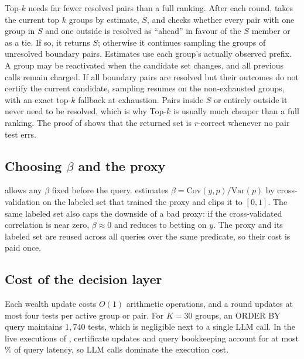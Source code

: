 Top-$k$ needs far fewer resolved pairs than a full ranking.
After each round, \sys{} takes the current top $k$ groups by estimate, $S$, and checks whether every pair with one group in $S$ and one outside is resolved as ``ahead'' in favour of the $S$ member or as a tie.
If so, it returns $S$; otherwise it continues sampling the groups of unresolved boundary pairs.
Estimates use each group's actually observed prefix. A group may be reactivated when the candidate set changes, and all previous calls remain charged. If all boundary pairs are resolved but their outcomes do not certify the current candidate, sampling resumes on the non-exhausted groups, with an exact top-$k$ fallback at exhaustion.
Pairs inside $S$ or entirely outside it never need to be resolved, which is why Top-$k$ is usually much cheaper than a full ranking.
The proof of  shows that the returned set is $r$-correct whenever no pair test errs.

\subsection{\texorpdfstring{Choosing $\beta$ and the proxy}{Choosing beta and the proxy}}

 allows any $\beta$ fixed before the query.
\sys{} estimates $\beta=\mathrm{Cov}(y,p)/\mathrm{Var}(p)$ by cross-validation on the labeled set that trained the proxy and clips it to $[0,1]$.
The same labeled set also caps the downside of a bad proxy: if the cross-validated correlation is near zero, $\beta\approx0$ and \sys{} reduces to betting on $y$.
The proxy and its labeled set are reused across all queries over the same predicate, so their cost is paid once.

\subsection{Cost of the decision layer}

Each wealth update costs $O(1)$ arithmetic operations, and a round updates at most four tests per active group or pair.
For $K=30$ groups, an ORDER BY query maintains $1{,}740$ tests, which is negligible next to a single LLM call.
In the live executions of , certificate updates and query bookkeeping account for at most \numLiveMaxOverhead\% of query latency, so LLM calls dominate the execution cost.
